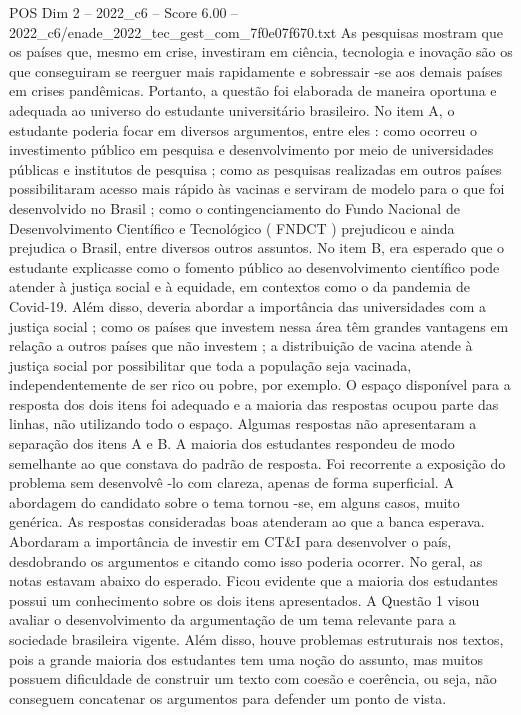 \begin{textsample}{POS Dim 2 – 2022\_c6 – Score 6.00 – 2022\_c6/enade\_2022\_tec\_gest\_com\_7f0e07f670.txt}
As pesquisas mostram que os países que, mesmo em crise, investiram em ciência, tecnologia e inovação são os que conseguiram se reerguer mais rapidamente e sobressair -se aos demais países em crises pandêmicas.
Portanto, a questão foi elaborada de maneira oportuna e adequada ao universo do estudante universitário brasileiro.
No item A, o estudante poderia focar em diversos argumentos, entre eles : como ocorreu o investimento público em pesquisa e desenvolvimento por meio de universidades públicas e institutos de pesquisa ; como as pesquisas realizadas em outros países possibilitaram acesso mais rápido às vacinas e serviram de modelo para o que foi desenvolvido no Brasil ; como o contingenciamento do Fundo Nacional de Desenvolvimento Científico e Tecnológico ( FNDCT ) prejudicou e ainda prejudica o Brasil, entre diversos outros assuntos.
No item B, era esperado que o estudante explicasse como o fomento público ao desenvolvimento científico pode atender à justiça social e à equidade, em contextos como o da pandemia de Covid-19.
Além disso, deveria abordar a importância das universidades com a justiça social ; como os países que investem nessa área têm grandes vantagens em relação a outros países que não investem ; a distribuição de vacina atende à justiça social por possibilitar que toda a população seja vacinada, independentemente de ser rico ou pobre, por exemplo.
O espaço disponível para a resposta dos dois itens foi adequado e a maioria das respostas ocupou parte das linhas, não utilizando todo o espaço.
Algumas respostas não apresentaram a separação dos itens A e B.
A maioria dos estudantes respondeu de modo semelhante ao que constava do padrão de resposta.
Foi recorrente a exposição do problema sem desenvolvê -lo com clareza, apenas de forma superficial.
A abordagem do candidato sobre o tema tornou -se, em alguns casos, muito genérica.
As respostas consideradas boas atenderam ao que a banca esperava.
Abordaram a importância de investir em CT\&I para desenvolver o país, desdobrando os argumentos e citando como isso poderia ocorrer.
No geral, as notas estavam abaixo do esperado.
Ficou evidente que a maioria dos estudantes possui um conhecimento sobre os dois itens apresentados.
A Questão 1 visou avaliar o desenvolvimento da argumentação de um tema relevante para a sociedade brasileira vigente.
Além disso, houve problemas estruturais nos textos, pois a grande maioria dos estudantes tem uma noção do assunto, mas muitos possuem dificuldade de construir um texto com coesão e coerência, ou seja, não conseguem concatenar os argumentos para defender um ponto de vista.

\end{textsample}
